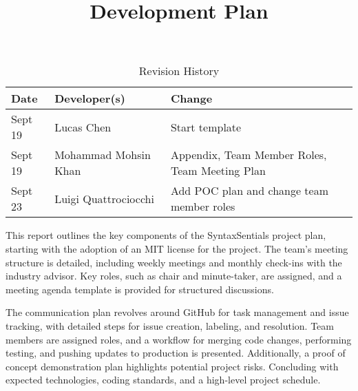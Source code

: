 \documentclass{article}
\title{Development Plan\\\progname}
\author{\authname}
\date{}
\begin{document}
\maketitle

\begin{table}[hp]
\caption{Revision History} \label{TblRevisionHistory}
\begin{tabularx}{\textwidth}{llX}
\toprule
\textbf{Date} & \textbf{Developer(s)} & \textbf{Change}\\
\midrule
Sept 19 & Lucas Chen & Start template\\
Sept 19 & Mohammad Mohsin Khan & Appendix, Team Member Roles, Team Meeting Plan\\
Sept 23 & Luigi Quattrociocchi & Add POC plan and change team member roles\\
\bottomrule
\end{tabularx}
\end{table}

\newpage{}

\tableofcontents

\newpage

This report outlines the key components of the SyntaxSentials project plan, 
starting with the adoption of an MIT license for the project. The team's meeting 
structure is detailed, including weekly meetings and monthly check-ins with the 
industry advisor. Key roles, such as chair and minute-taker, are assigned, and a 
meeting agenda template is provided for structured discussions.

The communication plan revolves around GitHub for task management and issue 
tracking, with detailed steps for issue creation, labeling, and resolution. 
Team members are assigned roles, and a workflow for merging code changes, 
performing testing, and pushing updates to production is presented. Additionally, 
a proof of concept demonstration plan highlights potential project risks. Concluding 
with expected technologies, coding standards, and a high-level project 
schedule.


\end{document}
